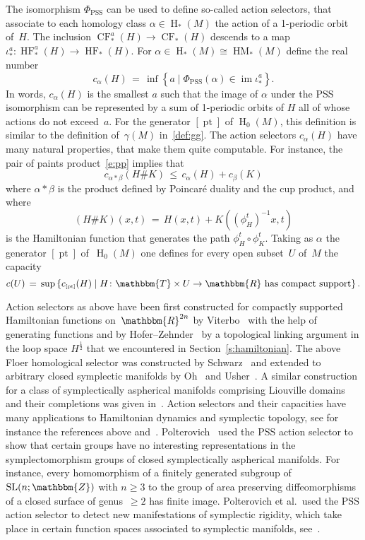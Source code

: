 \documentclass[12pt,twoside]{amsart}
\def\PSS{\scriptscriptstyle \operatorname{PSS}}
\theoremstyle{plain}
\numberwithin{figure}{section}
\numberwithin{equation}{section}
\def\im{\operatorname {im}}
\def\pt{\operatorname{pt}}
\def\H{\operatorname{H}}
\def\SL{\operatorname{SL}}
\def\HM{\operatorname{HM}}
\def\CF{\operatorname{CF}}
\def\HF{\operatorname{HF}}
\def\ga{\alpha}
\def\gb{\beta}
\def\gg{\gamma}
\def\RR{\mathbbm{R}}
\def\TT{\mathbbm{T}}
\def\ZZ{\mathbbm{Z}}
\begin{document}
The isomorphism $\Phi_{\PSS}$ can be used to define so-called action selectors, 
that associate to each homology class $\ga \in \H_* (M)$ the action of a 1-periodic orbit of~$H$.
%
The inclusion $\CF_*^a(H) \to \CF_*(H)$ descends to a map $\iota^a_* \colon \HF_*^a(H) \to \HF_*(H)$. 
For $\ga \in \H_* (M) \cong \HM_*(M)$ define the real number
%
\begin{equation} \label{def.cga}
c_\ga(H) \,=\, \inf \left\{ a \mid \Phi_{\PSS} (\ga) \in \im \iota^a_* \right\}.
\end{equation}
%
In words, $c_\ga(H)$ is the smallest $a$ such that the image of $\ga$ under the PSS isomorphism
can be represented by a sum of 1-periodic orbits of $H$ all of whose actions do not exceed~$a$.
For the generator $[\pt]$ of $\H_0(M)$, this definition is similar to the definition of~$\gg (M)$
in~\eqref{def:gg}.
%
The action selectors $c_\ga (H)$ have many natural properties, that make them quite computable. 
For instance, the pair of paints product~\eqref{e:pp} implies that
$$
c_{\ga * \gb}(H \# K) \,\leqslant\, c_{\ga} (H) + c_{\gb} (K)
$$
where $\ga * \gb$ is the product defined by Poincar\'e duality and the cup product, 
and where 
$$
(H \# K) (x,t) \,=\, H(x,t)+K( (\phi_{H}^t)^{-1}x,t)$$ 
is the Hamiltonian function 
that generates the path $\phi^t_H \circ \phi^t_K$.
%
Taking as $\ga$ the generator $[\pt]$ of~$\H_0(M)$ one defines for every open subset~$U$ of~$M$
the capacity
$$
c(U) \,=\, \sup \left\{ 
c_{\scriptscriptstyle [\pt]} (H) \mid  
H \colon \TT \times U \to \RR \mbox{ has compact support} 
\right\} .
$$ 

Action selectors as above have been first constructed for compactly supported Hamiltonian
functions on~$\RR^{2n}$ by Viterbo~\cite{Vi92} with the help of generating functions
and by Hofer--Zehnder~\cite{HoZe94} by a topological linking argument in the loop space $H^{\frac 12}$
that we encountered in Section~\ref{s:hamiltonian}.
%
The above Floer homological selector was constructed by Schwarz~\cite{Sch00}
and extended to arbitrary closed symplectic manifolds by Oh~\cite{Oh06} and Usher~\cite{Us08}.
A similar construction for a class of symplectically aspherical manifolds comprising Liouville domains
and their completions was given in~\cite{FrSch07}.
%
Action selectors and their capacities have many applications to Hamiltonian dynamics and symplectic topology,
see for instance the references above and~\cite{EP09, FrGiSch05, HRS16}.
%
Polterovich~\cite{po02} used the PSS action selector to show that certain groups have no interesting representations
in the symplectomorphism groups of closed symplectically aspherical manifolds.
For instance, every homomorphism of a finitely generated subgroup of $\SL (n;\ZZ)$ with $n \geqslant 3$
to the group of area preserving diffeomorphisms of a closed surface of genus~$\geqslant 2$
has finite image.
Polterovich et al.\ used the PSS action selector to detect new manifestations of symplectic rigidity,
which take place in certain function spaces associated to symplectic manifolds, see~\cite{PoRo14}.
\end{document}
